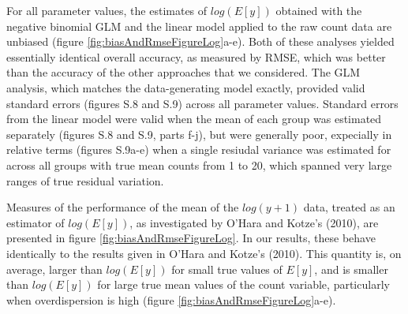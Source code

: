 \documentclass[]{article}
\begin{document}
For all parameter values, the estimates of \(log(E[y])\) obtained with
the negative binomial GLM and the linear model applied to the raw count
data are unbiased (figure \ref{fig:biasAndRmseFigureLog}a-e). Both of
these analyses yielded essentially identical overall accuracy, as
measured by RMSE, which was better than the accuracy of the other
approaches that we considered. The GLM analysis, which matches the
data-generating model exactly, provided valid standard errors (figures
S.8 and S.9) across all parameter values. Standard errors from the
linear model were valid when the mean of each group was estimated
separately (figures S.8 and S.9, parts f-j), but were generally poor,
expecially in relative terms (figures S.9a-e) when a single resiudal
variance was estimated for across all groups with true mean counts from
1 to 20, which spanned very large ranges of true residual variation.

Measures of the performance of the mean of the \(log(y+1)\) data,
treated as an estimator of \(log(E[y])\), as investigated by O'Hara and
Kotze's (2010), are presented in figure \ref{fig:biasAndRmseFigureLog}.
In our results, these behave identically to the results given in O'Hara
and Kotze's (2010). This quantity is, on average, larger than
\(log(E[y])\) for small true values of \(E[y]\), and is smaller than
\(log(E[y])\) for large true mean values of the count variable,
particularly when overdispersion is high (figure
\ref{fig:biasAndRmseFigureLog}a-e).
\end{document}
